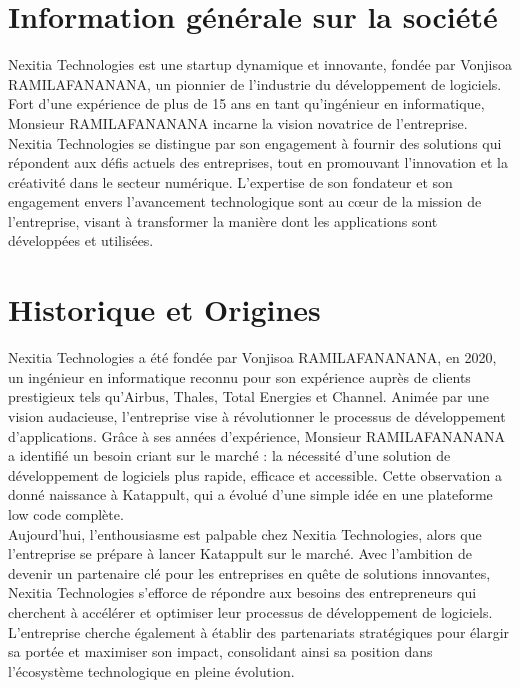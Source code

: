\documentclass[12pt]{report}
\begin{document}
				\section{Information générale sur la société}

				\hspace{15pt} Nexitia Technologies est une startup dynamique et innovante, fondée par Vonjisoa RAMILAFANANANA, un pionnier de l'industrie du développement de logiciels. Fort d'une expérience de plus de 15 ans en tant qu'ingénieur en informatique, Monsieur RAMILAFANANANA incarne la vision novatrice de l'entreprise.\\

				Nexitia Technologies se distingue par son engagement à fournir des solutions qui répondent aux défis actuels des entreprises, tout en promouvant l'innovation et la créativité dans le secteur numérique. L'expertise de son fondateur et son engagement envers l'avancement technologique sont au cœur de la mission de l'entreprise, visant à transformer la manière dont les applications sont développées et utilisées.

				\section{Historique et Origines}

				\hspace{15pt} Nexitia Technologies a été fondée par Vonjisoa RAMILAFANANANA, en 2020, un ingénieur en informatique reconnu pour son expérience auprès de clients prestigieux tels qu'Airbus, Thales, Total Energies et Channel. Animée par une vision audacieuse, l'entreprise vise à révolutionner le processus de développement d'applications. Grâce à ses années d'expérience, Monsieur RAMILAFANANANA a identifié un besoin criant sur le marché : la nécessité d'une solution de développement de logiciels plus rapide, efficace et accessible. Cette observation a donné naissance à Katappult, qui a évolué d'une simple idée en une plateforme low code complète.\\

				Aujourd'hui, l'enthousiasme est palpable chez Nexitia Technologies, alors que l'entreprise se prépare à lancer Katappult sur le marché. Avec l'ambition de devenir un partenaire clé pour les entreprises en quête de solutions innovantes, Nexitia Technologies s'efforce de répondre aux besoins des entrepreneurs qui cherchent à accélérer et optimiser leur processus de développement de logiciels. L'entreprise cherche également à établir des partenariats stratégiques pour élargir sa portée et maximiser son impact, consolidant ainsi sa position dans l'écosystème technologique en pleine évolution.
\end{document}
